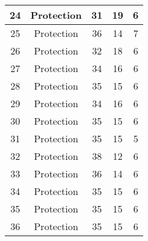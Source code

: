 \documentclass[results.tex]{subfiles}
\begin{document}
\begin{center}
\begin{tabular}{| c || c | c | c | c |}
            \hline
            24                      & Protection                   & 31                     & 19                      & 6                    \\
            \hline
            25                      & Protection                   & 36                     & 14                      & 7                    \\
            \hline
            26                      & Protection                   & 32                     & 18                      & 6                    \\
            \hline
            27                      & Protection                   & 34                     & 16                      & 6                    \\
            \hline
            28                      & Protection                   & 35                     & 15                      & 6                    \\
            \hline
            29                      & Protection                   & 34                     & 16                      & 6                    \\
            \hline
            30                      & Protection                   & 35                     & 15                      & 6                    \\
            \hline
            31                      & Protection                   & 35                     & 15                      & 5                    \\
            \hline
            32                      & Protection                   & 38                     & 12                      & 6                    \\
            \hline
            33                      & Protection                   & 36                     & 14                      & 6                    \\
            \hline
            34                      & Protection                   & 35                     & 15                      & 6                    \\
            \hline
            35                      & Protection                   & 35                     & 15                      & 6                    \\
            \hline
            36                      & Protection                   & 35                     & 15                      & 6                    \\

\end{tabular}
\end{center}
\end{document}
